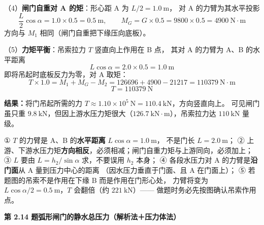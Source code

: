 \begin{jie}
（4）\textbf{闸门自重对 A 的矩}：形心距 A 为 $L/2=1.0\ \mathrm{m}$，
对 A 的力臂为其水平投影
\[ \frac{L}{2}\cos\alpha=1.0\times0.5=0.5\ \mathrm{m},\qquad
M_G=G\times0.5=9800\times0.5=4900\ \mathrm{N\cdot m} \]
方向与 $M_1$ 相同（闸门自重把下缘压向底板）。

（5）\textbf{力矩平衡}：吊索拉力 $T$ 竖直向上作用在 B 点，
其对 A 的力臂为 A、B 的水平距离
\[ L\cos\alpha=2.0\times0.5=1.0\ \mathrm{m} \]
即将吊起时底板反力为零，对 A 取矩：
\[ T\times1.0=M_1+M_G-M_2=126696+4900-21217=110379\ \mathrm{N\cdot m} \]
\[ T=110379\ \mathrm{N} \]

\textbf{结果：}将门吊起所需的力 $T\approx1.10\times10^5\ \mathrm{N}=110.4\ \mathrm{kN}$，方向竖直向上。
可见闸门虽只重 $9.8\ \mathrm{kN}$，但因上游水压力矩很大（$126.7\ \mathrm{kN\cdot m}$），吊索拉力达 $110\ \mathrm{kN}$ 量级。
\end{jie}

\begin{yicuo}
① $T$ 的力臂是 A、B 的\textbf{水平距离} $L\cos\alpha=1.0\ \mathrm{m}$，
不是门长 $L=2.0\ \mathrm{m}$；
② 上游、下游水压力矩\textbf{方向相反}，必须相减；闸门自重力矩与上游同向，必须加上；
③ $L$ 要由 $L=h_2/\sin\alpha$ 求，不要误用 $h_2$ 本身；
④ 各段水压力对 A 的力臂是\textbf{沿门面}从 A 量到压力中心的距离
（因水压力垂直于门面、且 A 在门面上）；
⑤ 若题图的吊索不是作用在下缘 B 而是作用在门形心处，
力臂将变为 $L\cos\alpha/2=0.5\ \mathrm{m}$，$T$ 会翻倍（约 $221\ \mathrm{kN}$）——
做题时务必先按图确认吊索作用点。
\end{yicuo}

\noindent\textbf{第 2.14 题\quad 弧形闸门的静水总压力（解析法＋压力体法）}

